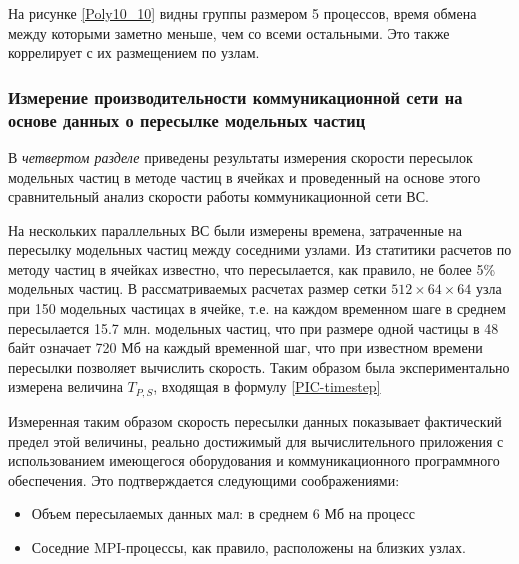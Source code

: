        
        На рисунке \ref{Poly10_10} видны группы размером 5 процессов, время обмена между которыми заметно меньше, чем со всеми остальными. Это также коррелирует с их размещением по узлам.
        
        
        
   \clearpage     
        
        
        
       
        
        
		\subsubsection{Измерение производительности коммуникационной сети на основе данных о пересылке модельных частиц}
		В \textit{четвертом разделе} приведены результаты измерения скорости пересылок модельных частиц в методе частиц в ячейках и проведенный на основе этого сравнительный анализ скорости работы коммуникационной сети ВС.
		
		На нескольких параллельных ВС были измерены времена, затраченные на пересылку модельных частиц между соседними узлами. Из статитики расчетов по методу частиц в ячейках известно, что пересылается, как правило, не более 5\% модельных частиц. В рассматриваемых расчетах размер сетки $512\times 64 \times 64$ узла  при 150 модельных частицах в ячейке, т.е.  на каждом временном шаге в среднем пересылается 15.7 млн. модельных частиц, что при размере одной частицы в 48 байт означает 720 Мб на каждый временной шаг, что при известном времени пересылки позволяет вычислить скорость. Таким образом была экспериментально измерена величина $T_{P,S}$, входящая в формулу \ref{PIC-timestep}   
			
			
			
			Измеренная таким образом скорость пересылки данных показывает фактический предел этой величины, реально достижимый для вычислительного приложения с использованием имеющегося оборудования и коммуникационного программного обеспечения. Это подтверждается следующими соображениями:
			\begin{itemize}
				\item Объем пересылаемых данных мал: в среднем 6 Мб на процесс
				\item Соседние MPI-процессы, как правило, расположены на близких узлах.
			\end{itemize}  	 
			
